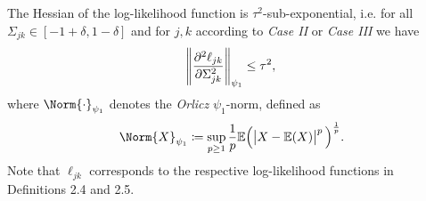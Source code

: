 \begin{condition}\label{Hessian statistical noise}
    The Hessian of the log-likelihood function is $\tau^2$-sub-exponential, i.e. for all $\Sigma_{jk} \in [-1+\delta, 1-\delta]$ and for $j,k$ according to \textit{Case II} or \textit{Case III} we have
    \begin{equation}
        \norm{\frac{\partial^2\ell_{jk}}{\partial \Sigma_{jk}^{2}}}_{\psi_{1}} \leq \tau^2,
    \end{equation}
    where $\Norm{\cdot}_{\psi_{1}}$ denotes the \textit{Orlicz} $\psi_{1}$-norm, defined as
    \begin{equation*}
        \Norm{X}_{\psi_{1}} \coloneqq \sup_{p\geq 1} \frac{1}{p}\mathbb{E}\Big(\abs{X - \mathbb{E}(X)}^p\Big)^{\frac{1}{p}}.
    \end{equation*}
    Note that $\ell_{jk}$ corresponds to the respective log-likelihood functions in Definitions 2.4 and 2.5.%


\end{condition}
